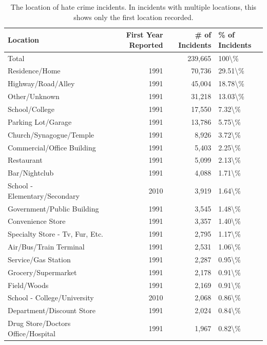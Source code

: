 \documentclass[
  12pt,
  openany]{book}
\begin{document}
\begin{longtable}[t]{lrrl}
\caption{\label{tab:hateLocations}The location of hate crime incidents. In incidents with multiple locations, this shows only the first location recorded.}\\
\toprule
Location & First Year Reported & \# of Incidents & \% of Incidents\\
\midrule
Total &  & 239,665 & 100\textbackslash{}\%\\
Residence/Home & 1991 & 70,736 & 29.51\textbackslash{}\%\\
Highway/Road/Alley & 1991 & 45,004 & 18.78\textbackslash{}\%\\
Other/Unknown & 1991 & 31,218 & 13.03\textbackslash{}\%\\
School/College & 1991 & 17,550 & 7.32\textbackslash{}\%\\
\addlinespace
Parking Lot/Garage & 1991 & 13,786 & 5.75\textbackslash{}\%\\
Church/Synagogue/Temple & 1991 & 8,926 & 3.72\textbackslash{}\%\\
Commercial/Office Building & 1991 & 5,403 & 2.25\textbackslash{}\%\\
Restaurant & 1991 & 5,099 & 2.13\textbackslash{}\%\\
Bar/Nightclub & 1991 & 4,088 & 1.71\textbackslash{}\%\\
\addlinespace
School - Elementary/Secondary & 2010 & 3,919 & 1.64\textbackslash{}\%\\
Government/Public Building & 1991 & 3,545 & 1.48\textbackslash{}\%\\
Convenience Store & 1991 & 3,357 & 1.40\textbackslash{}\%\\
Specialty Store - Tv, Fur, Etc. & 1991 & 2,795 & 1.17\textbackslash{}\%\\
Air/Bus/Train Terminal & 1991 & 2,531 & 1.06\textbackslash{}\%\\
\addlinespace
Service/Gas Station & 1991 & 2,287 & 0.95\textbackslash{}\%\\
Grocery/Supermarket & 1991 & 2,178 & 0.91\textbackslash{}\%\\
Field/Woods & 1991 & 2,169 & 0.91\textbackslash{}\%\\
School - College/University & 2010 & 2,068 & 0.86\textbackslash{}\%\\
Department/Discount Store & 1991 & 2,024 & 0.84\textbackslash{}\%\\
\addlinespace
Drug Store/Doctors Office/Hospital & 1991 & 1,967 & 0.82\textbackslash{}\%\\

\end{longtable}
\end{document}
